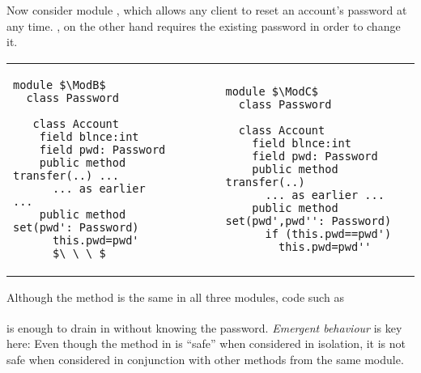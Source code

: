  
Now consider  module \ModB, which allows any client to reset an account's password at any time.  \ModC, on the other hand  requires the existing password in order to change it.
  
  

\begin{tabular}{lll}
\begin{minipage}[b]{0.42\textwidth}
\begin{lstlisting}[mathescape=true, language=Chainmail, frame=lines]
module $\ModB$
  class Password
  
   class Account
    field blnce:int 
    field pwd: Password 
    public method transfer(..) ...
      ... as earlier ...
    public method set(pwd': Password)
      this.pwd=pwd'
      $\ \ \ $
\end{lstlisting}
\end{minipage}
&\ \ \  \ \   &%
\begin{minipage}[b]{0.45\textwidth}
\begin{lstlisting}[mathescape=true, language=chainmail, frame=lines]
module $\ModC$
  class Password

  class Account
    field blnce:int 
    field pwd: Password 
    public method transfer(..) 
      ... as earlier ...
    public method set(pwd',pwd'': Password)
      if (this.pwd==pwd') 
        this.pwd=pwd''
\end{lstlisting}
\end{minipage} 
\end{tabular}

\noindent
Although the  method is the same in
all three modules,   %
code  {such as}
\\ 
$\ \strut \hspace{.2in} $  
\\ 
is enough to drain   in \ModB without knowing the password.
%
\emph{Emergent behaviour} is key here: 
Even though the method  in  \ModB is ``safe'' when considered in isolation, it is not safe when considered in conjunction with other methods from the same module. 
   

